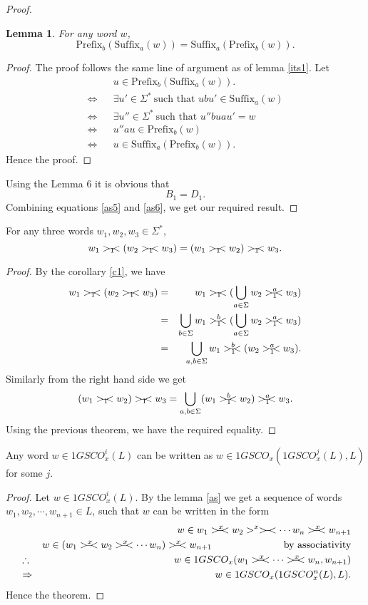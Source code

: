 \documentclass{llncs}
\newtheorem{lem}{Lemma}
\newcommand{\sg}{\Sigma}
\newcommand{\p}{\mathrm{Prefix}}
\newcommand{\s}{\mathrm{Suffix}}
\newcommand{\rs}{\hspace{-3.5mm}-\hspace{-2mm}<}
\newcommand{\ers}{>\hspace{-2mm}-\hspace{-2mm}<}
\begin{document}
\begin{proof}
\begin{lem}\label{asl2}
For any word $w$,
\[\p_b(\s_a(w))=\s_a(\p_b(w)).\]
\end{lem}
\begin{proof}
The proof follows the same line of argument as of lemma \ref{its1}.
Let
\begin{eqnarray*}
&&u\in\p_b(\s_a(w)).\\
\Leftrightarrow&&\exists u'\in \sg^*~\mbox{such that~}ubu'\in\s_a(w)\\
\Leftrightarrow&&\exists u''\in \sg^*~\mbox{such that~}u''buau'=w\\
\Leftrightarrow&&u''au\in\p_b(w)\\
\Leftrightarrow&&u\in\s_a(\p_b(w)).
\end{eqnarray*}
Hence the proof.
\end{proof}
 Using the Lemma 6 it is obvious that
\begin{equation}\label{as6}
B_1=D_1.
\end{equation}
Combining equations \ref{as5} and \ref{as6}, we get our required result.
\end{proof}\begin{corollary}
For any three words $w_1,w_2,w_3\in \sg^*$,
\[w_1>_1\rs(w_2>_1\rs w_3)=(w_1>_1\rs w_2)>_1\rs w_3.\]

\end{corollary}
\begin{proof}
By the corollary \ref{c1}, we have
\begin{eqnarray*}
w_1>_1\rs(w_2>_1\rs w_3)&=&w_1>_1\rs(\bigcup_{a\in\sg}w_2>_1^a\rs w_3)\\
        &=&\bigcup_{b\in\sg}w_1>_1^b\rs(\bigcup_{a\in\sg}w_2>_1^a\rs w_3)\\
        &=&\bigcup_{a,b\in\sg}w_1>_1^b\rs(w_2>_1^a\rs w_3).
\end{eqnarray*}
Similarly from the right hand side we get
\[ (w_1>_1\rs w_2)>_1\rs w_3=\bigcup_{a,b\in\sg}(w_1>_1^b\rs w_2)>_1^a\rs w_3.\]
Using the previous theorem, we have the required equality.
\end{proof}
\begin{theorem}
Any word $w\in1GSCO_x^i(L)$ can be written as
\(w\in1GSCO_x(1GSCO_x^j(L),L)\) for some $j$.
\end{theorem}
\begin{proof}
Let $w\in1GSCO_x^i(L)$. By the lemma \ref{as} we get a sequence of
words $w_1,w_2,\cdots,w_{n+1}\in L$, such that $w$ can be written in
the form
\begin{eqnarray*}
&&w\in w_1>^x\rs w_2>^x\ers\cdots w_n>^x\rs w_{n+1}\\
&&w\in (w_1>^x\rs w_2>^x\rs\cdots w_n)>^x\rs w_{n+1}\hspace{1in}\mbox{by associativity}\\
&\therefore&w\in1GSCO_x(w_1>^x\rs\cdots>^x\rs w_n,w_{n+1})\\
&\Rightarrow&w\in1GSCO_x(1GSCO_x^n(L),L).
\end{eqnarray*}
Hence the theorem.
\end{proof}
\end{document}
